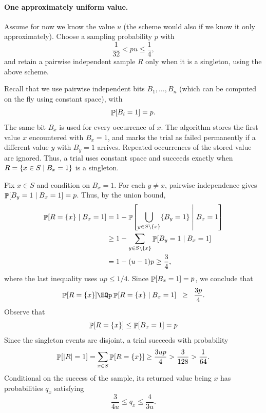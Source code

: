 \paragraph*{One approximately uniform value.}
Assume for now we know the value $u$ (the scheme would also if we know it
only approximately).  Choose a sampling probability $p$ with
\begin{equation*}
    \frac{1}{32}
    <
    pu
    \leq
    \frac{1}{4},
\end{equation*}
and retain a pairwise independent sample $R$ only when it
is a singleton, using the above scheme.

Recall that we use pairwise independent bits $B_1, \ldots, B_n$ (which
can be computed on the fly using constant space), with
\begin{equation*}
    \Prob{B_i=1}=p.
\end{equation*}
The same bit $B_x$ is used for every occurrence of $x$. The algorithm
stores the first value $x$ encountered with $B_x=1$, and marks the trial
as failed permanently if a different value $y$ with $B_y=1$
arrives. Repeated occurrences of the stored value are ignored. Thus, a
trial uses constant space and succeeds exactly when
$R=\left\{ x\in S \;\middle\vert\; B_x=1 \right\}$ is a singleton.

Fix $x\in S$ and condition on $B_x=1$. For each $y\neq x$, pairwise
independence gives $\mathop{\mathbb{P}}\!\left[ B_y=1 \;\middle\vert\; B_x=1 \right]=p$. Thus, by the union bound,
\begin{align*}
    \mathop{\mathbb{P}}\!\left[ R=\{x\} \;\middle\vert\; B_x=1 \right]
    &=1-\mathop{\mathbb{P}}\!\left[ \bigcup_{y\in S\setminus\{x\}}\{B_y=1\} \;\middle\vert\; B_x=1 \right]
    \\
    &\geq1-\sum_{y\in S\setminus\{x\}}
                   \mathop{\mathbb{P}}\!\left[ B_y=1 \;\middle\vert\; B_x=1 \right]
    \\
    &=1-(u-1)p\geq\frac34,
\end{align*}
where the last inequality uses $up\leq1/4$. Since $\Prob{B_x=1}=p$,
we conclude that
\[
    \Prob{R=\{x\}}
    \EQ%
    p\ProbCond{R=\{x\}}{B_x=1}
    \GEQ%
    \frac{3p}{4}.
\]
Observe that
\begin{equation*}
    \Prob{R=\{x\}}
    \leq
    \Prob{B_x = 1}
    =
    p
\end{equation*}
Since the singleton events are disjoint, a trial succeeds with probability
\[
    \Prob{\cardin{R}=1}
    =\sum_{x\in S}\Prob{R=\{x\}}
    \geq\frac{3up}{4}>\frac{3}{128}>\frac{1}{64}.
\]
Conditional on the success of the sample, its returned value being $x$
has probabilities $q_x$ satisfying
\[
    \frac{3}{4u}\leq q_x\leq\frac{4}{3u}.
\]

